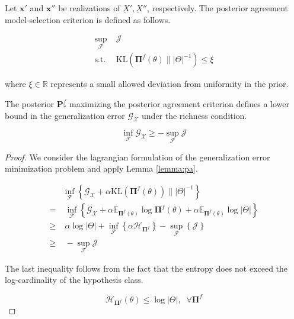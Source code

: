 \begin{definition}\label{def:pa}
    Let $\bm{x'}$ and $\bm{x''}$ be realizations of $\underbar{X}', \underbar{X}''$, respectively. 
    The posterior agreement model-selection criterion is defined as follows.

    $$
    \begin{aligned}
        \sup_{\mathcal{F}} & \; \mathcal{J} \\
        \text{s.t.} & \; \text{KL}(\mathbf{\Pi}^f(\theta) \parallel |\Theta|^{-1}) \leq \xi
    \end{aligned}
    $$
    
    where $\xi \in \mathbb{R}$ represents a small allowed deviation from uniformity in the prior.
\end{definition}

\begin{theorem}
The posterior $\mathbf{P}_{*}^f$ maximizing the posterior agreement criterion defines a lower bound
in the generalization error $\mathcal{G}_{\mathcal{X}}$ under the richness condition.

$$
    \inf_{\mathcal{F}} \mathcal{G}_{\mathcal{X}} \geq -\sup_{\mathcal{F}} \mathcal{J}
$$
\end{theorem}

\begin{proof}
    We consider the lagrangian formulation of the generalization error minimization problem 
    and apply Lemma \ref{lemma:pa}.

    $$
    \begin{aligned}
        & \inf_{\mathcal{F}} \left \{ \mathcal{G}_{\mathcal{X}} + \alpha \text{KL} (\mathbf{\Pi}^f(\theta)) \parallel |\Theta|^{-1} \right \} \\
        = & \; \inf_{\mathcal{F}} \left \{ \mathcal{G}_{\mathcal{X}} + \alpha \mathbb{E}_{\mathbf{\Pi}^f(\theta)} \log \mathbf{\Pi}^f(\theta) + \alpha \mathbb{E}_{\mathbf{\Pi}^f(\theta)} \log |\Theta| \right \} \\
        \geq & \; \alpha \log |\Theta| + \inf_{\mathcal{F}} \left \{ \alpha \mathcal{H}_{\mathbf{\Pi}^f} \right \} - \sup_{\mathcal{F}} \left \{ \mathcal{J} \right \} \\
        \geq & \; - \sup_{\mathcal{F}} \mathcal{J}
    \end{aligned}
    $$

    The last inequality follows from the fact that the entropy does not exceed the log-cardinality
    of the hypothesis class.

    $$
    \mathcal{H}_{\mathbf{\Pi}^f}(\theta) \leq \log |\Theta|, \;\; \forall \mathbf{\Pi}^f
    $$
\end{proof}




